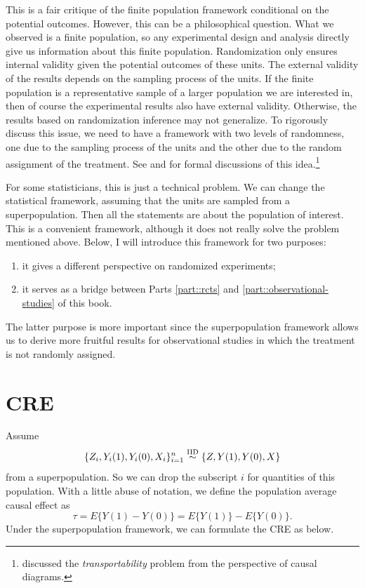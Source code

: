 This is a fair critique of the finite population framework conditional on the potential outcomes. However, this can be a philosophical question. What we observed is a finite population, so any experimental design and analysis directly give us information about this finite population. Randomization only ensures internal validity given the potential outcomes of these units. The external validity of the results depends on the sampling process of the units. If the finite population is a representative sample of a larger population we are interested in, then of course the experimental results also have external validity. Otherwise, the results based on randomization inference may not generalize. To rigorously discuss this issue, we need to have a framework with two levels of randomness, one due to the sampling process of the units and the other due to the random assignment of the treatment. See \citet{miratrix2018worth} and \citet{abadie2020sampling} for formal discussions of this idea.\footnote{\citet{pearl2014external} discussed the {\it transportability} problem from the perspective of causal diagrams.}
  
  
  
  
For some statisticians, this is just a technical problem. We can change the statistical framework, assuming that the units are sampled from a superpopulation. Then all the statements are about the population of interest. This is a convenient framework, although it does not really solve the problem mentioned above. Below, I will introduce this framework for two purposes:
\begin{enumerate}
\item
it gives a different perspective on randomized experiments;
\item
it serves as a bridge between Parts \ref{part::rcts} and  \ref{part::observational-studies} of this book.
\end{enumerate}
The latter purpose is more important since the superpopulation framework allows us to derive more fruitful results for observational studies in which the treatment is not randomly assigned. 





\section{CRE}\label{sec::cre-superpop}

Assume 
$$
\{  Z_i, Y_i(1), Y_i(0),  X_i  \}_{i=1}^n  \stackrel{\textup{IID}}{\sim} \{  Z, Y(1), Y(0), X \}
$$ 
from a superpopulation. So we can drop the subscript $i$ for quantities of this population.   With a little abuse of notation, we define the population average causal effect as
$$
\tau  = E\{  Y(1)  - Y(0)\}  = E\{  Y(1)  \} -  E\{ Y(0)\} .
$$
Under the superpopulation framework, we can formulate the CRE as below.

